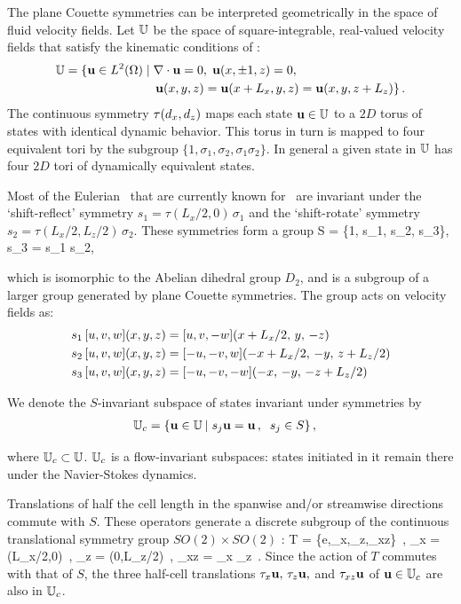 \documentclass[letter,12pt,openany]{article}
\begin{document}
The plane Couette symmetries can be interpreted geometrically in the space of
fluid velocity fields. Let $\mathbb{U}$ be the space of
square-integrable, real-valued velocity fields that satisfy the kinematic
conditions of \pCf:
\begin{align}
 \bbU  &= \{\bu \in L^2(\Omega) \; | \; \grad \cdot \bu = 0,
               \; \bu(x, \pm 1, z) = 0, \notag  \\
         &\phantom{=} {} \qquad \qquad \qquad \; \; %
          \bu(x, y, z) = \bu(x+L_x, y, z) = \bu(x, y, z + L_z)\}  \,.
\end{align} 
The continuous symmetry $\tau(d_x, d_z)$ maps each state
${\bf u} \in \mathbb{U}$ to a $2D$ torus of states with identical dynamic
behavior. This torus in turn is mapped to four equivalent tori by
the subgroup $\{1,\sigma_1,\sigma_2, \sigma_1 \sigma_2\}$. In
general a given state in $\mathbb{U}$ has four $2D$ tori of dynamically
equivalent states.

Most of the Eulerian \eqva\ that are currently known for \pCf\
are invariant under the `shift-reflect' symmetry
$s_1 = \tau(L_x/2,0) \, \sigma_1$ and the `shift-rotate' symmetry
$s_2 = \tau(L_x/2,L_z/2) \, \sigma_2$.  These symmetries form a group
\beq
S = \{1, s_1, s_2, s_3\}, \qquad s_3 = s_1 s_2, 
\eeq

which is isomorphic to
the Abelian dihedral group $D_2$, and is a subgroup of a larger group generated by plane Couette symmetries. The group acts on velocity fields
as:
\begin{align}
s_1 \, [u, v, w](x,y,z) &= [u, v, -w](x+L_x/2,\, y,\, -z) \nonumber \\ 
s_2 \, [u, v, w](x,y,z) &= [-u, -v, w](-x+L_x/2,\,-y,\,z+L_z/2) \label{shiftRot} \\
s_3 \, [u, v, w](x,y,z) &= [-u,-v,-w](-x,\, -y,\, -z+L_z/2)  \nonumber 
\,
\end{align}


We denote the $S$-invariant subspace of states invariant under
symmetries  by
\begin{align}
\mathbb{U}_{c}  &= \{{\bf u} \in \mathbb{U}  \: | \;
              s_j {\bf u} = {\bf u}\,, \;\;  s_j \in S \}
\,,
\label{symmSubspU}
\end{align}

where $ \mathbb{U}_{c} \subset \mathbb{U}$.
%
$\mathbb{U}_{c}$ is a flow-invariant subspaces: states initiated
in it remain there under the Navier-Stokes dynamics.


Translations of half the cell length in the spanwise and/or streamwise
directions commute with $S$. These operators generate a discrete
subgroup of the continuous translational symmetry group $SO(2) \times
SO(2)$ :
\beq
T = \{e,\tau_x,\tau_z,\tau_{xz}\}
    \,,\qquad
    \tau_x = \tau(L_x/2,0)
    \,,\;
    \tau_z = \tau(0,L_z/2)
    \,,\;
    \tau_{xz} = \tau_x \tau_z
\,.
Since the action of $T$ commutes with that of $S$,
the three half-cell translations $\tau_x {\bf u}, \, \tau_z {\bf u},$ and
$\tau_{xz} {\bf u}$ of ${\bf u} \in \mathbb{U}_{c}$ are also in $\mathbb{U}_{c}$.
\end{document}
